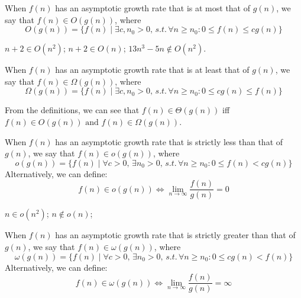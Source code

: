 \begin{definition}\label{def:big-o-notation}
    When $f(n)$ has an asymptotic growth rate that is at most that of $g(n)$, we say that $f(n)\in O(g(n))$, where
    \[
        O(g(n)) = \{f(n) \mid \exists c, n_0 > 0,\, s.t.\, \forall n\geq n_0 : 0 \leq f(n) \leq cg(n)\}
    \]
\end{definition}

\begin{example}
    $n + 2 \in O(n^2)$; \quad
    $n + 2 \in O(n)$; \quad
    $13n^3 - 5n \notin O(n^2)$.
\end{example}

\begin{definition}\label{def:big-omega-notation}
    When $f(n)$ has an asymptotic growth rate that is at least that of $g(n)$, we say that $f(n)\in \Omega(g(n))$, where
    \[
        \Omega(g(n)) = \{f(n) \mid \exists c, n_0 > 0,\, s.t.\, \forall n\geq n_0 : 0 \leq cg(n) \leq f(n)\}
    \]
\end{definition}

\begin{remark}
    From the definitions, we can see that $f(n)\in\Theta(g(n))$ iff $f(n)\in O(g(n)) \text{ and } f(n)\in\Omega(g(n))$.
\end{remark}

\begin{definition}\label{def:small-o-notation}
    When $f(n)$ has an asymptotic growth rate that is strictly less than that of $g(n)$, we say that $f(n)\in o(g(n))$, where
    \[
        o(g(n)) = \{f(n) \mid \forall c > 0,\, \exists n_0 > 0,\, s.t.\, \forall n\geq n_0 : 0 \leq f(n) < cg(n)\}
    \]
    Alternatively, we can define:
    \[
        f(n)\in o(g(n)) \Longleftrightarrow \lim_{n\to\infty} \frac{f(n)}{g(n)} = 0
    \]
\end{definition}

\begin{example}
    $n \in o(n^2)$; \quad
    $n \notin o(n)$;
\end{example}

\begin{definition}\label{def:small-omega-notation}
    When $f(n)$ has an asymptotic growth rate that is strictly greater than that of $g(n)$, we say that $f(n)\in \omega(g(n))$, where
    \[
        \omega(g(n)) = \{f(n) \mid \forall c > 0,\, \exists n_0 > 0,\, s.t.\, \forall n\geq n_0 : 0 \leq cg(n) < f(n)\}
    \]
    Alternatively, we can define:
    \[
        f(n)\in \omega(g(n)) \Longleftrightarrow \lim_{n\to\infty} \frac{f(n)}{g(n)} = \infty
    \]
\end{definition}

